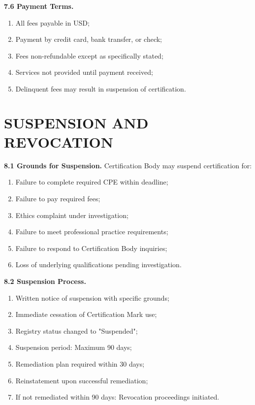\documentclass[11pt,a4paper]{article}
\begin{document}
\textbf{7.6 Payment Terms.}
\begin{enumerate}[label=\alph*)]
\item All fees payable in USD;
\item Payment by credit card, bank transfer, or check;
\item Fees non-refundable except as specifically stated;
\item Services not provided until payment received;
\item Delinquent fees may result in suspension of certification.
\end{enumerate}

\section{SUSPENSION AND REVOCATION}

\textbf{8.1 Grounds for Suspension.} Certification Body may suspend certification for:

\begin{enumerate}[label=\alph*)]
\item Failure to complete required CPE within deadline;
\item Failure to pay required fees;
\item Ethics complaint under investigation;
\item Failure to meet professional practice requirements;
\item Failure to respond to Certification Body inquiries;
\item Loss of underlying qualifications pending investigation.
\end{enumerate}

\textbf{8.2 Suspension Process.}

\begin{enumerate}[label=\alph*)]
\item Written notice of suspension with specific grounds;
\item Immediate cessation of Certification Mark use;
\item Registry status changed to "Suspended";
\item Suspension period: Maximum 90 days;
\item Remediation plan required within 30 days;
\item Reinstatement upon successful remediation;
\item If not remediated within 90 days: Revocation proceedings initiated.
\end{enumerate}
\end{document}
